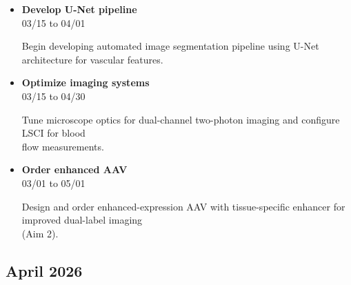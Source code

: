 \documentclass[landscape,a4paper]{article}
\begin{document}
\begin{itemize}[leftmargin=1cm, itemsep=0.8em]
    \item \textcolor{other}{\textbf{Develop U-Net pipeline}}\\[0.2em]
          \textcolor{black!70}{\small 03/15 to 04/01}
\\[0.3em]
          \begin{minipage}[t]{0.85\textwidth}
          \textcolor{black!80}{Begin developing automated image segmentation pipeline using U-Net architecture for vascular features.}
          \end{minipage}

    \item \textcolor{other}{\textbf{Optimize imaging systems}}\\[0.2em]
          \textcolor{black!70}{\small 03/15 to 04/30}
\\[0.3em]
          \begin{minipage}[t]{0.85\textwidth}
          \textcolor{black!80}{Tune microscope optics for dual-channel two-photon imaging and configure LSCI for blood\\[0.1em]
          flow measurements.}
          \end{minipage}

    \item \textcolor{other}{\textbf{Order enhanced AAV}}\\[0.2em]
          \textcolor{black!70}{\small 03/01 to 05/01}
\\[0.3em]
          \begin{minipage}[t]{0.85\textwidth}
          \textcolor{black!80}{Design and order enhanced-expression AAV with tissue-specific enhancer for improved dual-label imaging\\[0.1em]
          (Aim 2).}
          \end{minipage}

\end{itemize}

\subsection*{April 2026}
\vspace{0.5cm}
\end{document}
